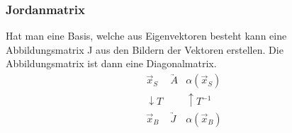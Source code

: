 \documentclass[a4paper,10pt]{scrartcl}
\begin{document}
                \subsubsection{Jordanmatrix}
                    Hat man eine Basis, welche aus Eigenvektoren besteht kann eine Abbildungsmatrix J aus den Bildern der Vektoren erstellen. Die Abbildungsmatrix 
                    ist dann eine Diagonalmatrix. 
                    \[
                        \begin{matrix}
                            \vec{x}_S & \underrightarrow{A} & \alpha(\vec{x}_S) \\
                            \downarrow T & & \uparrow T^{-1} \\
                            \vec{x}_B & \underrightarrow{J} & \alpha(\vec{x}_B)
                        \end{matrix}
                    \]
\end{document}
